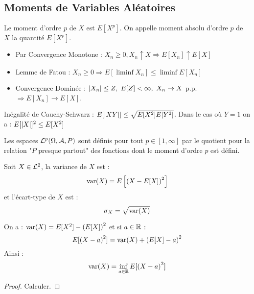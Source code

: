 \documentclass{cours}
\begin{document}
    \subsection{Moments de Variables Aléatoires}
    \begin{definition}
        Le moment d'ordre $p$ de $X$ est $E[X^{p}]$. On appelle moment absolu d'ordre $p$ de $X$ la quantité $E\left[X^{p}\right]$.
    \end{definition}

    \begin{proposition}
        \begin{itemize}
            \item Par Convergence Monotone : $X_{n} \geq 0, X_{n} \uparrow X \Rightarrow E[X_{n}] \uparrow E[X]$
            \item Lemme de Fatou : $X_{n} \geq 0 \Rightarrow E[\liminf X_{n}] \leq \liminf E[X_{n}]$ 
            \item Convergence Dominée : $\left|X_{n}\right| \leq Z, \ E[Z] < \infty, \ X_{n} \rightarrow X$ p.p. $\Rightarrow E[X_{n}] \rightarrow E[X]$.
        \end{itemize}
    \end{proposition}

    \begin{proposition}
        Inégalité de Cauchy-Schwarz : $E[\left|XY\right|] \leq \sqrt{E[X^{2}]E[Y^{2}]}$. Dans le cas où $Y = 1$ on a : $E[\left|X\right|]^{2} \leq E[X^{2}]$
    \end{proposition}

    Les espaces $\mathcal{L}^{p}(\Omega, \mathcal{A}, P)$ sont définis pour tout $p \in \left[1, \infty\right]$ par le quotient pour la relation "$P$ presque partout" des fonctions dont le moment d'ordre $p$ est défini. 

    \begin{definition}
        Soit $X \in \mathcal{L}^{2}$, la variance de $X$ est : 
        \[
            \operatorname{var}(X) = E\left[\left(X - E[X]\right)^{2}\right]
        \]
        et l'écart-type de $X$ est :
        \[
            \sigma_{X} = \sqrt{\operatorname{var}(X)}  
        \]
    \end{definition}

    \begin{proposition}
        On a : $\operatorname{var}(X) = E[X^{2}] - \left(E[X]\right)^{2}$ et si $a \in \mathbb{R}$ : 
        \[
            E[\left(X - a\right)^{2}] = \operatorname{var}(X) + \left(E[X] - a\right)^{2}
        \]
        Ainsi : 
        \[
            \operatorname{var}(X) = \inf_{a\in \mathbb{R}} E[\left(X - a\right)^{2}]
        \]
    \end{proposition}
    \begin{proof}
        Calculer.
    \end{proof}
\end{document}
